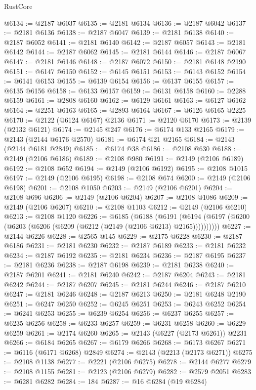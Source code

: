 \begin{lexlean}{RustCore}
\begin{coremodule}
@6134 := @2187 @6037
@6135 := @2181 @6134
@6136 := @2187 @6042
@6137 := @2181 @6136
@6138 := @2187 @6047
@6139 := @2181 @6138
@6140 := @2187 @6052
@6141 := @2181 @6140
@6142 := @2187 @6057
@6143 := @2181 @6142
@6144 := @2187 @6062
@6145 := @2181 @6144
@6146 := @2187 @6067
@6147 := @2181 @6146
@6148 := @2187 @6072
@6150 := @2181 @6148 @2190
@6151 := @6147 @6150
@6152 := @6145 @6151
@6153 := @6143 @6152
@6154 := @6141 @6153
@6155 := @6139 @6154
@6156 := @6137 @6155
@6157 := @6135 @6156
@6158 := @6133 @6157
@6159 := @6131 @6158
@6160 := @2288 @6159
@6161 := @2808 @6160
@6162 := @6129 @6161
@6163 := @6127 @6162
@6164 := @2251 @6163
@6165 := @2893 @6164
@6167 := @6126 @6165 @2225
@6170 := @2122 (@6124 @6167) @2136
@6171 := @2120 @6170
@6173 := @2139 (@2132 @6121)
@6174 := @2145 @247
@6176 := @6174 @133 @2165
@6179 := @2143 (@2144 @6176 @2570)
@6181 := @6174 @21 @2165
@6184 := @2143 (@2144 @6181 @2849)
@6185 := @6174 @38
@6186 := @2108 @630
@6188 := @2149 (@2106 @6186)
@6189 := @2108 @980
@6191 := @2149 (@2106 @6189)
@6192 := @2108 @652
@6194 := @2149 (@2106 @6192)
@6195 := @2108 @1015
@6197 := @2149 (@2106 @6195)
@6198 := @2108 @674
@6200 := @2149 (@2106 @6198)
@6201 := @2108 @1050
@6203 := @2149 (@2106 @6201)
@6204 := @2108 @696
@6206 := @2149 (@2106 @6204)
@6207 := @2108 @1086
@6209 := @2149 (@2106 @6207)
@6210 := @2108 @1103
@6212 := @2149 (@2106 @6210)
@6213 := @2108 @1120
@6226 := @6185
    (@6188
      (@6191 (@6194 (@6197 (@6200 (@6203 (@6206 (@6209 (@6212 (@2149 (@2106 @6213) @2165))))))))))
@6227 := @2144 @6226
@6228 := @2565 @145
@6229 := @2175 @6228
@6230 := @2187 @6186
@6231 := @2181 @6230
@6232 := @2187 @6189
@6233 := @2181 @6232
@6234 := @2187 @6192
@6235 := @2181 @6234
@6236 := @2187 @6195
@6237 := @2181 @6236
@6238 := @2187 @6198
@6239 := @2181 @6238
@6240 := @2187 @6201
@6241 := @2181 @6240
@6242 := @2187 @6204
@6243 := @2181 @6242
@6244 := @2187 @6207
@6245 := @2181 @6244
@6246 := @2187 @6210
@6247 := @2181 @6246
@6248 := @2187 @6213
@6250 := @2181 @6248 @2190
@6251 := @6247 @6250
@6252 := @6245 @6251
@6253 := @6243 @6252
@6254 := @6241 @6253
@6255 := @6239 @6254
@6256 := @6237 @6255
@6257 := @6235 @6256
@6258 := @6233 @6257
@6259 := @6231 @6258
@6260 := @6229 @6259
@6261 := @2174 @6260
@6265 := @2143 (@6227 (@2173 @6261)) @2231
@6266 := @6184 @6265
@6267 := @6179 @6266
@6268 := @6173 @6267
@6271 := @6116 (@6171 @6268) @2849
@6274 := @2143 (@2213 (@2173 @6271))
@6275 := @2108 @1138
@6277 := @2221 (@2106 @6275)
@6278 := @2144 @6277
@6279 := @2108 @1155
@6281 := @2123 (@2106 @6279)
@6282 := @2579 @2051
@6283 := @6281 @6282
@6284 := 184
@6287 := @16 @6284 (@19 @6284)

\end{coremodule}
\end{lexlean}
